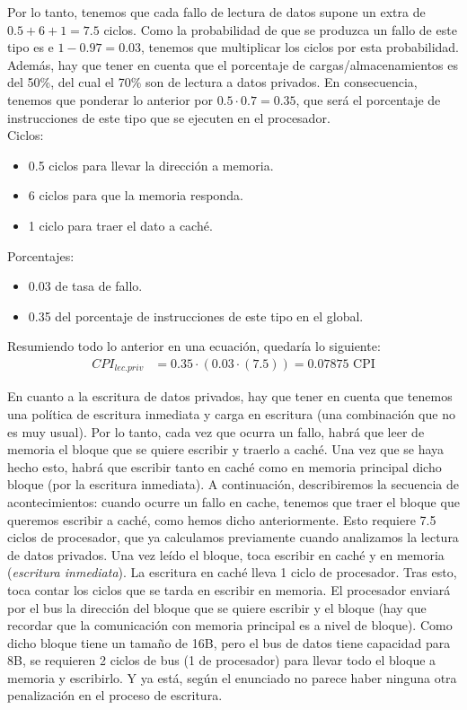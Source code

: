 \documentclass[12pt,a4paper]{article}
\begin{document}
Por lo tanto, tenemos que cada fallo de lectura de datos supone un extra de $0.5+6+1=7.5$ ciclos. Como la probabilidad de que se produzca un fallo de este tipo es e $1-0.97=0.03$, tenemos que multiplicar los ciclos por esta probabilidad. Además, hay que tener en cuenta que el porcentaje de cargas/almacenamientos es del 50\%, del cual el 70\% son de lectura a datos privados. En consecuencia, tenemos que ponderar lo anterior por $0.5\cdot 0.7=0.35$, que será el porcentaje de instrucciones de este tipo que se ejecuten en el procesador.\\

Ciclos:
\begin{itemize}
\item 0.5 ciclos para llevar la dirección a memoria.
\item 6 ciclos para que la memoria responda.
\item 1 ciclo para traer el dato a caché.
\end{itemize}

Porcentajes:
\begin{itemize}
\item 0.03 de tasa de fallo.
\item 0.35 del porcentaje de instrucciones de este tipo en el global.
\end{itemize}

Resumiendo todo lo anterior en una ecuación, quedaría lo siguiente:
\begin{align*}
CPI_{lec.priv}&=0.35\cdot (0.03\cdot (7.5))=0.07875\text{ CPI}
\end{align*}

En cuanto a la escritura de datos privados, hay que tener en cuenta que tenemos una política de escritura inmediata y carga en escritura (una combinación que no es muy usual). Por lo tanto, cada vez que ocurra un fallo, habrá que leer de memoria el bloque que se quiere escribir y traerlo a caché. Una vez que se haya hecho esto, habrá que escribir tanto en caché como en memoria principal dicho bloque (por la escritura inmediata). A continuación, describiremos la secuencia de acontecimientos: cuando ocurre un fallo en cache, tenemos que traer el bloque que queremos escribir a caché, como hemos dicho anteriormente. Esto requiere 7.5 ciclos de procesador, que ya calculamos previamente cuando analizamos la lectura de datos privados. Una vez leído el bloque, toca escribir en caché y en memoria (\textit{escritura inmediata}). La escritura en caché lleva 1 ciclo de procesador. Tras esto, toca contar los ciclos que se tarda en escribir en memoria. El procesador enviará por el bus la dirección del bloque que se quiere escribir y el bloque (hay que recordar que la comunicación con memoria principal es a nivel de bloque). Como dicho bloque tiene un tamaño de 16B, pero el bus de datos tiene capacidad para 8B, se requieren 2 ciclos de bus (1 de procesador) para llevar todo el bloque a memoria y escribirlo. Y ya está, según el enunciado no parece haber ninguna otra penalización en el proceso de escritura.\\
\end{document}
